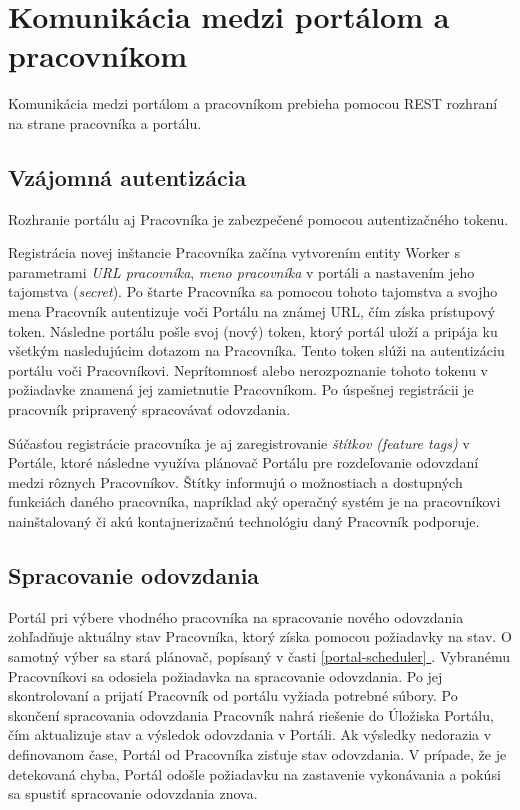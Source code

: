 \documentclass[
  digital, %
  twoside, %
  table,   %
  lof,     %
  lot,     %
]{fithesis3}
\newcommand*{\fullref}[1]{\hyperref[{#1}]{\autoref*{#1} \nameref*{#1}}}
\begin{document}
\section{Komunikácia medzi portálom a pracovníkom}

Komunikácia medzi portálom a pracovníkom prebieha pomocou REST rozhraní na strane pracovníka a portálu. 

\subsection{Vzájomná autentizácia}
\label{komunikacia-portal-pracovnik}

Rozhranie portálu aj Pracovníka je zabezpečené pomocou autentizačného tokenu. 

Registrácia novej inštancie Pracovníka začína vytvorením entity Worker s parametrami \emph{URL pracovníka}, \emph{meno pracovníka} v portáli a nastavením jeho tajomstva (\emph{secret}). Po štarte Pracovníka sa pomocou tohoto tajomstva a svojho mena Pracovník autentizuje voči Portálu na známej URL, čím získa prístupový token. Následne portálu pošle svoj (nový) token, ktorý portál uloží a pripája ku všetkým nasledujúcim dotazom na Pracovníka. Tento token slúži na autentizáciu portálu voči Pracovníkovi. Neprítomnosť alebo nerozpoznanie tohoto tokenu v požiadavke znamená jej zamietnutie Pracovníkom. Po úspešnej registrácii je pracovník pripravený spracovávať odovzdania.

Súčasťou registrácie pracovníka je aj zaregistrovanie \emph{štítkov (feature tags)} v Portále, ktoré následne využíva plánovač Portálu pre rozdeľovanie odovzdaní medzi rôznych Pracovníkov. Štítky informujú o možnostiach a dostupných funkciách daného pracovníka, napríklad aký operačný systém je na pracovníkovi nainštalovaný či akú kontajnerizačnú technológiu daný Pracovník podporuje. 

\subsection{Spracovanie odovzdania}
Portál pri výbere vhodného pracovníka na spracovanie nového odovzdania zohľadňuje aktuálny stav Pracovníka, ktorý získa pomocou požiadavky na stav. O samotný výber sa stará plánovač, popísaný v časti \fullref{portal-scheduler}. Vybranému Pracovníkovi sa odosiela požiadavka na spracovanie odovzdania. Po jej skontrolovaní a prijatí Pracovník od portálu vyžiada potrebné súbory. Po skončení spracovania odovzdania Pracovník nahrá riešenie do Úložiska Portálu, čím aktualizuje stav a výsledok odovzdania v Portáli. Ak výsledky nedorazia v definovanom čase, Portál od Pracovníka zisťuje stav odovzdania. V prípade, že je detekovaná chyba, Portál odošle požiadavku na zastavenie vykonávania a pokúsi sa spustiť spracovanie odovzdania znova. 
\end{document}
